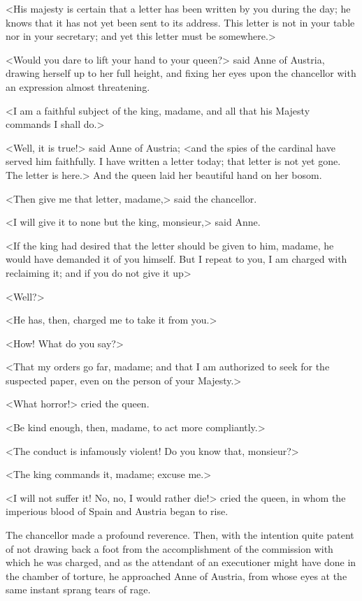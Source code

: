 <His majesty is certain that a letter has been written by you during the day; he knows that it has not yet been sent to its address. This letter is not in your table nor in your secretary; and yet this letter must be somewhere.> 

<Would you dare to lift your hand to your queen?> said Anne of Austria, drawing herself up to her full height, and fixing her eyes upon the chancellor with an expression almost threatening. 

<I am a faithful subject of the king, madame, and all that his Majesty commands I shall do.> 

<Well, it is true!> said Anne of Austria; <and the spies of the cardinal have served him faithfully. I have written a letter today; that letter is not yet gone. The letter is here.> And the queen laid her beautiful hand on her bosom. 

<Then give me that letter, madame,> said the chancellor. 

<I will give it to none but the king, monsieur,> said Anne. 

<If the king had desired that the letter should be given to him, madame, he would have demanded it of you himself. But I repeat to you, I am charged with reclaiming it; and if you do not give it up\longdash> 

<Well?> 

<He has, then, charged me to take it from you.> 

<How! What do you say?> 

<That my orders go far, madame; and that I am authorized to seek for the suspected paper, even on the person of your Majesty.> 

<What horror!> cried the queen. 

<Be kind enough, then, madame, to act more compliantly.> 

<The conduct is infamously violent! Do you know that, monsieur?> 

<The king commands it, madame; excuse me.> 

<I will not suffer it! No, no, I would rather die!> cried the queen, in whom the imperious blood of Spain and Austria began to rise. 

The chancellor made a profound reverence. Then, with the intention quite patent of not drawing back a foot from the accomplishment of the commission with which he was charged, and as the attendant of an executioner might have done in the chamber of torture, he approached Anne of Austria, from whose eyes at the same instant sprang tears of rage. 

